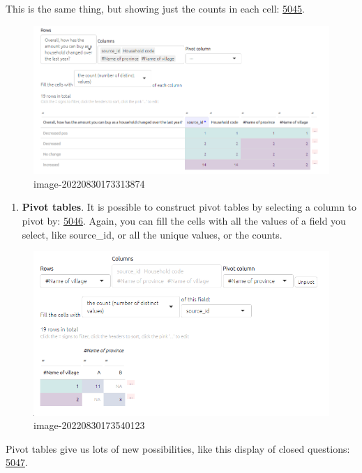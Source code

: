 \documentclass[
]{book}
\providecommand{\tightlist}{%
  \setlength{\itemsep}{0pt}\setlength{\parskip}{0pt}}
\begin{document}
This is the same thing, but showing just the counts in each cell: \href{https://causalmap.shinyapps.io/tokyo/?s=5045}{5045}.

\begin{figure}
\centering
\includegraphics{_assets/image-20220830173313874.png}
\caption{image-20220830173313874}
\end{figure}

\begin{enumerate}
\def\labelenumi{\arabic{enumi}.}
\setcounter{enumi}{2}
\tightlist
\item
  \textbf{Pivot tables}. It is possible to construct pivot tables by selecting a column to pivot by: \href{https://causalmap.shinyapps.io/tokyo/?s=5046}{5046}. Again, you can fill the cells with all the values of a field you select, like source\_id, or all the unique values, or the counts.
\end{enumerate}

\begin{figure}
\centering
\includegraphics{_assets/image-20220830173540123.png}
\caption{image-20220830173540123}
\end{figure}

Pivot tables give us lots of new possibilities, like this display of closed questions: \href{https://causalmap.shinyapps.io/tokyo/?s=5047}{5047}.
\end{document}
